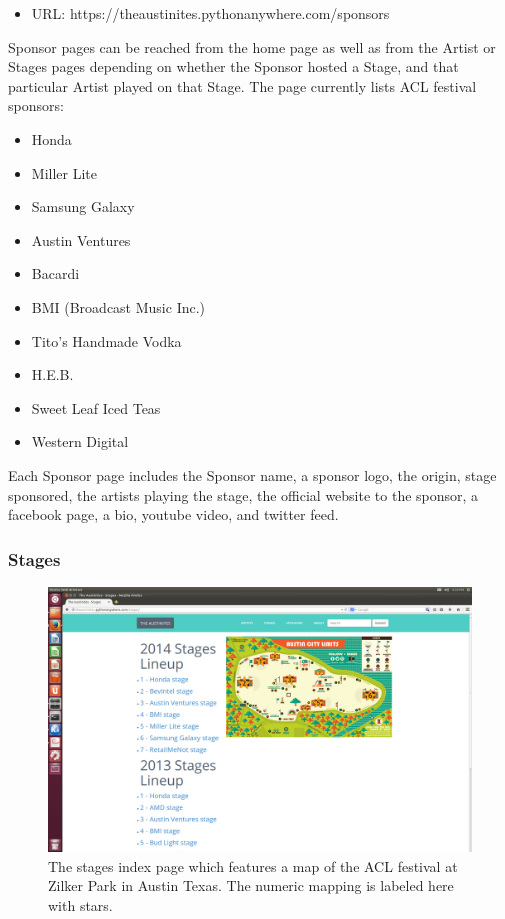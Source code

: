 \documentclass[12pt,english]{scrartcl}
\begin{document}
\begin{itemize}
 \item URL: https://theaustinites.pythonanywhere.com/sponsors
\end{itemize}

Sponsor pages can be reached from the home page as well as from the Artist or Stages pages depending on whether the Sponsor hosted a
Stage, and that particular Artist played on that Stage. The page currently lists ACL festival sponsors:
\begin{itemize}
 \item Honda
 \item Miller Lite
 \item Samsung Galaxy
 \item Austin Ventures
 \item Bacardi
 \item BMI (Broadcast Music Inc.)
 \item Tito's Handmade Vodka
 \item H.E.B.
 \item Sweet Leaf Iced Teas
 \item Western Digital
\end{itemize}
Each Sponsor page includes the Sponsor name, a sponsor logo, the origin, stage sponsored, the artists playing the stage, the official website to the sponsor,
a facebook page, a bio, youtube video, and twitter feed.

\subsubsection{Stages}
\begin{figure}[h!]
\includegraphics[width=\textwidth]{stages.png}
 \caption{The stages index page which features a map of the ACL festival at Zilker Park in Austin Texas. The numeric mapping is labeled here with stars.}
\end{figure}
\end{document}
